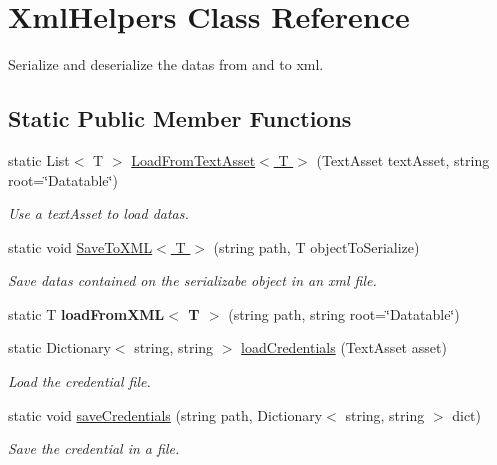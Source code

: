 \hypertarget{class_xml_helpers}{\section{Xml\-Helpers Class Reference}
\label{class_xml_helpers}
}


Serialize and deserialize the datas from and to xml. 


\subsection*{Static Public Member Functions}
\begin{DoxyCompactItemize}
\item 
static List$<$ T $>$ \hyperlink{class_xml_helpers_abba18899056ac494e095d059603a13a5}{Load\-From\-Text\-Asset$<$ T $>$} (Text\-Asset text\-Asset, string root=\char`\"{}Datatable\char`\"{})
\begin{DoxyCompactList}\small\item\em Use a text\-Asset to load datas.\end{DoxyCompactList}\item 
static void \hyperlink{class_xml_helpers_a1aaa77054366a2bf78bebae8ab3653c0}{Save\-To\-X\-M\-L$<$ T $>$} (string path, T object\-To\-Serialize)
\begin{DoxyCompactList}\small\item\em Save datas contained on the serializabe object in an xml file.\end{DoxyCompactList}\item 
\hypertarget{class_xml_helpers_a20dd95341881821cc75de8fc2a8ccd82}{static T {\bfseries load\-From\-X\-M\-L$<$ T $>$} (string path, string root=\char`\"{}Datatable\char`\"{})}\label{class_xml_helpers_a20dd95341881821cc75de8fc2a8ccd82}

\item 
static Dictionary$<$ string, string $>$ \hyperlink{class_xml_helpers_a02588698e9def0f90871650f0a6c9384}{load\-Credentials} (Text\-Asset asset)
\begin{DoxyCompactList}\small\item\em Load the credential file.\end{DoxyCompactList}\item 
static void \hyperlink{class_xml_helpers_a9534034c0c9b736d03ec4191e887cacd}{save\-Credentials} (string path, Dictionary$<$ string, string $>$ dict)
\begin{DoxyCompactList}\small\item\em Save the credential in a file.\end{DoxyCompactList}\end{DoxyCompactItemize}


